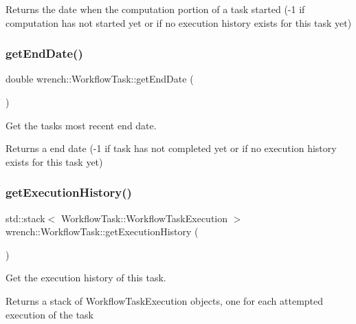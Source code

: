 \begin{DoxyReturn}{Returns}
the date when the computation portion of a task started (-\/1 if computation has not started yet or if no execution history exists for this task yet) 
\end{DoxyReturn}
\mbox{\label{classwrench_1_1_workflow_task_a2c413ff97c665416c2c68898ef986df0}} 
\subsubsection{\texorpdfstring{get\+End\+Date()}{getEndDate()}}
{\footnotesize\ttfamily double wrench\+::\+Workflow\+Task\+::get\+End\+Date (\begin{DoxyParamCaption}{ }\end{DoxyParamCaption})}



Get the task\textquotesingle{}s most recent end date. 

\begin{DoxyReturn}{Returns}
a end date (-\/1 if task has not completed yet or if no execution history exists for this task yet) 
\end{DoxyReturn}
\mbox{\label{classwrench_1_1_workflow_task_a69dc57568ee24ef1d2824e9f6d919d48}} 
\subsubsection{\texorpdfstring{get\+Execution\+History()}{getExecutionHistory()}}
{\footnotesize\ttfamily std\+::stack$<$ Workflow\+Task\+::\+Workflow\+Task\+Execution $>$ wrench\+::\+Workflow\+Task\+::get\+Execution\+History (\begin{DoxyParamCaption}{ }\end{DoxyParamCaption})}



Get the execution history of this task. 

\begin{DoxyReturn}{Returns}
a stack of Workflow\+Task\+Execution objects, one for each attempted execution of the task 
\end{DoxyReturn}
\mbox{\label{classwrench_1_1_workflow_task_af166a3b9b4b9d7a62711d3431961cd4f}} 
